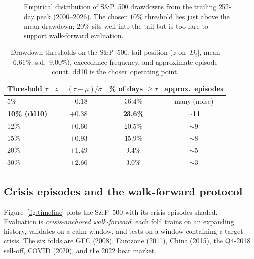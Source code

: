 \documentclass[11pt,a4paper]{article}
\begin{document}
\begin{figure}[t]
\centering
{}
\caption{Empirical distribution of S\&P~500 drawdowns from the trailing
252-day peak (2000--2026). The chosen $10\%$ threshold lies just above the
mean drawdown; $20\%$ sits well into the tail but is too rare to support
walk-forward evaluation.}
\label{fig:drawdown}
\end{figure}

\begin{table}[t]
\centering\small
\caption{Drawdown thresholds on the S\&P~500: tail position ($z$ on $|D_t|$,
mean $6.61\%$, s.d.\ $9.00\%$), exceedance frequency, and approximate episode
count. dd10 is the chosen operating point.}
\label{tab:thr}
\begin{tabular}{lccc}
\toprule
Threshold $\tau$ & $z=(\tau-\mu)/\sigma$ & \% of days $\ge\tau$ & approx.\ episodes \\
\midrule
5\%  & $-0.18$ & 36.4\% & many (noise) \\
\textbf{10\% (dd10)} & $\mathbf{+0.38}$ & \textbf{23.6\%} & \textbf{$\sim$11} \\
12\% & $+0.60$ & 20.5\% & $\sim$9 \\
15\% & $+0.93$ & 15.9\% & $\sim$8 \\
20\% & $+1.49$ & \phantom{0}9.4\% & $\sim$5 \\
30\% & $+2.60$ & \phantom{0}3.0\% & $\sim$3 \\
\bottomrule
\end{tabular}
\end{table}

\subsection{Crisis episodes and the walk-forward protocol}
\label{sec:method-cv}
Figure~\ref{fig:timeline} plots the S\&P~500 with its crisis episodes shaded.
Evaluation is \emph{crisis-anchored walk-forward}: each fold trains on an
expanding history, validates on a calm window, and tests on a window
containing a target crisis. The six folds are GFC (2008), Eurozone (2011),
China (2015), the Q4-2018 sell-off, COVID (2020), and the 2022 bear market.
\end{document}
